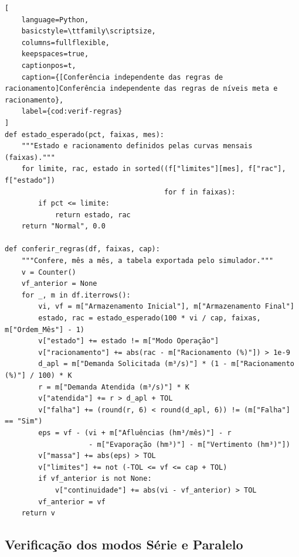 \noindent\begin{minipage}{\linewidth}
\begin{lstlisting}[
    language=Python,
    basicstyle=\ttfamily\scriptsize,
    columns=fullflexible,
    keepspaces=true,
    captionpos=t,
    caption={[Conferência independente das regras de racionamento]Conferência independente das regras de níveis meta e racionamento},
    label={cod:verif-regras}
]
def estado_esperado(pct, faixas, mes):
    """Estado e racionamento definidos pelas curvas mensais (faixas)."""
    for limite, rac, estado in sorted((f["limites"][mes], f["rac"], f["estado"])
                                      for f in faixas):
        if pct <= limite:
            return estado, rac
    return "Normal", 0.0

def conferir_regras(df, faixas, cap):
    """Confere, mês a mês, a tabela exportada pelo simulador."""
    v = Counter()
    vf_anterior = None
    for _, m in df.iterrows():
        vi, vf = m["Armazenamento Inicial"], m["Armazenamento Final"]
        estado, rac = estado_esperado(100 * vi / cap, faixas, m["Ordem_Mês"] - 1)
        v["estado"] += estado != m["Modo Operação"]
        v["racionamento"] += abs(rac - m["Racionamento (%)"]) > 1e-9
        d_apl = m["Demanda Solicitada (m³/s)"] * (1 - m["Racionamento (%)"] / 100) * K
        r = m["Demanda Atendida (m³/s)"] * K
        v["atendida"] += r > d_apl + TOL
        v["falha"] += (round(r, 6) < round(d_apl, 6)) != (m["Falha"] == "Sim")
        eps = vf - (vi + m["Afluências (hm³/mês)"] - r
                    - m["Evaporação (hm³)"] - m["Vertimento (hm³)"])
        v["massa"] += abs(eps) > TOL
        v["limites"] += not (-TOL <= vf <= cap + TOL)
        if vf_anterior is not None:
            v["continuidade"] += abs(vi - vf_anterior) > TOL
        vf_anterior = vf
    return v
\end{lstlisting}
\end{minipage}
\par\medskip




\subsection{Verificação dos modos Série e Paralelo}
\label{subsec:metodo-verif-multi}

